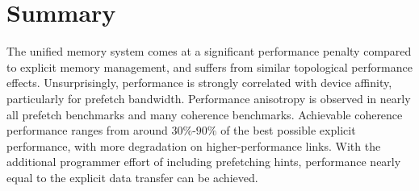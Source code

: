 \section{Summary}

The unified memory system comes at a significant performance penalty compared to explicit memory management, and suffers from similar topological performance effects.
Unsurprisingly, performance is strongly correlated with device affinity, particularly for prefetch bandwidth.
Performance anisotropy is observed in nearly all prefetch benchmarks and many coherence benchmarks.
Achievable coherence performance ranges from around $30\%$-$90\%$ of the best possible explicit performance, with more degradation on higher-performance links.
With the additional programmer effort of including prefetching hints, performance nearly equal to the explicit data transfer can be achieved.